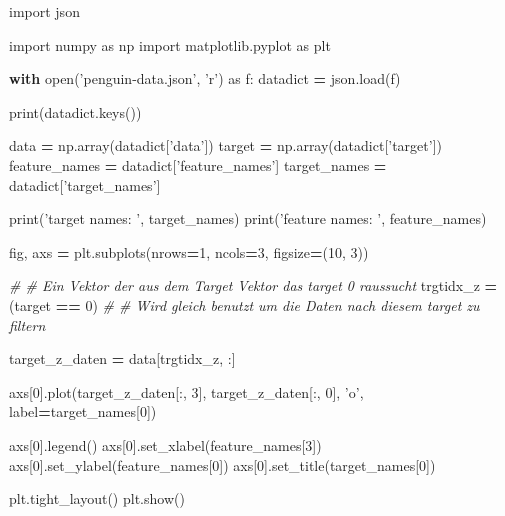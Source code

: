 \documentclass[]{book}
\newenvironment{Shaded}{\begin{snugshade}}{\end{snugshade}}
\newcommand{\BuiltInTok}[1]{#1}
\newcommand{\CommentTok}[1]{\textcolor[rgb]{0.56,0.35,0.01}{\textit{#1}}}
\newcommand{\ControlFlowTok}[1]{\textcolor[rgb]{0.13,0.29,0.53}{\textbf{#1}}}
\newcommand{\DecValTok}[1]{\textcolor[rgb]{0.00,0.00,0.81}{#1}}
\newcommand{\ImportTok}[1]{#1}
\newcommand{\NormalTok}[1]{#1}
\newcommand{\OperatorTok}[1]{\textcolor[rgb]{0.81,0.36,0.00}{\textbf{#1}}}
\newcommand{\StringTok}[1]{\textcolor[rgb]{0.31,0.60,0.02}{#1}}
\theoremstyle{definition}
\theoremstyle{definition}
\theoremstyle{definition}
\theoremstyle{definition}
\theoremstyle{remark}
\begin{document}
\begin{Shaded}
\begin{Highlighting}[]
\ImportTok{import}\NormalTok{ json}

\ImportTok{import}\NormalTok{ numpy }\ImportTok{as}\NormalTok{ np}
\ImportTok{import}\NormalTok{ matplotlib.pyplot }\ImportTok{as}\NormalTok{ plt}

\ControlFlowTok{with} \BuiltInTok{open}\NormalTok{(}\StringTok{'penguin-data.json'}\NormalTok{, }\StringTok{'r'}\NormalTok{) }\ImportTok{as}\NormalTok{ f:}
\NormalTok{    datadict }\OperatorTok{=}\NormalTok{ json.load(f)}

\BuiltInTok{print}\NormalTok{(datadict.keys())}

\NormalTok{data }\OperatorTok{=}\NormalTok{ np.array(datadict[}\StringTok{'data'}\NormalTok{])}
\NormalTok{target }\OperatorTok{=}\NormalTok{ np.array(datadict[}\StringTok{'target'}\NormalTok{])}
\NormalTok{feature_names }\OperatorTok{=}\NormalTok{ datadict[}\StringTok{'feature_names'}\NormalTok{]}
\NormalTok{target_names }\OperatorTok{=}\NormalTok{ datadict[}\StringTok{'target_names'}\NormalTok{]}

\BuiltInTok{print}\NormalTok{(}\StringTok{'target names: '}\NormalTok{, target_names)}
\BuiltInTok{print}\NormalTok{(}\StringTok{'feature names: '}\NormalTok{, feature_names)}

\NormalTok{fig, axs }\OperatorTok{=}\NormalTok{ plt.subplots(nrows}\OperatorTok{=}\DecValTok{1}\NormalTok{, ncols}\OperatorTok{=}\DecValTok{3}\NormalTok{, figsize}\OperatorTok{=}\NormalTok{(}\DecValTok{10}\NormalTok{, }\DecValTok{3}\NormalTok{))}

\CommentTok{# # Ein Vektor der aus dem Target Vektor das target 0 raussucht}
\NormalTok{trgtidx_z }\OperatorTok{=}\NormalTok{ (target }\OperatorTok{==} \DecValTok{0}\NormalTok{)}
\CommentTok{# # Wird gleich benutzt um die Daten nach diesem target zu filtern}

\NormalTok{target_z_daten }\OperatorTok{=}\NormalTok{ data[trgtidx_z, :]}

\NormalTok{axs[}\DecValTok{0}\NormalTok{].plot(target_z_daten[:, }\DecValTok{3}\NormalTok{], target_z_daten[:, }\DecValTok{0}\NormalTok{],}
            \StringTok{'o'}\NormalTok{, label}\OperatorTok{=}\NormalTok{target_names[}\DecValTok{0}\NormalTok{])}

\NormalTok{axs[}\DecValTok{0}\NormalTok{].legend()}
\NormalTok{axs[}\DecValTok{0}\NormalTok{].set_xlabel(feature_names[}\DecValTok{3}\NormalTok{])}
\NormalTok{axs[}\DecValTok{0}\NormalTok{].set_ylabel(feature_names[}\DecValTok{0}\NormalTok{])}
\NormalTok{axs[}\DecValTok{0}\NormalTok{].set_title(target_names[}\DecValTok{0}\NormalTok{])}

\NormalTok{plt.tight_layout()}
\NormalTok{plt.show()}
\end{Highlighting}
\end{Shaded}
\end{document}

